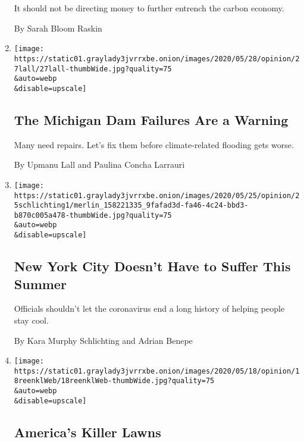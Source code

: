 \begin{enumerate}
  It should not be directing money to further entrench the carbon
  economy.

  By Sarah Bloom Raskin
\item
  \href{/2020/05/27/opinion/michigan-edenville-dam.html}{}

  \texttt{[image: https://static01.graylady3jvrrxbe.onion/images/2020/05/28/opinion/27lall/27lall-thumbWide.jpg?quality=75\\\&auto=webp\\\&disable=upscale]}

  \hypertarget{the-michigan-dam-failures-are-a-warning}{%
  \subsection{The Michigan Dam Failures Are a
  Warning}\label{the-michigan-dam-failures-are-a-warning}}

  Many need repairs. Let's fix them before climate-related flooding gets
  worse.

  By Upmanu Lall and Paulina Concha Larrauri
\item
  \href{/2020/05/25/opinion/new-york-summer-coronavirus.html}{}

  \texttt{[image: https://static01.graylady3jvrrxbe.onion/images/2020/05/25/opinion/25schlichting1/merlin\_158221335\_9fafad3d-fa46-4c24-bbd3-b870c005a478-thumbWide.jpg?quality=75\\\&auto=webp\\\&disable=upscale]}

  \hypertarget{new-york-city-doesnt-have-to-suffer-this-summer}{%
  \subsection{New York City Doesn't Have to Suffer This
  Summer}\label{new-york-city-doesnt-have-to-suffer-this-summer}}

  Officials shouldn't let the coronavirus end a long history of helping
  people stay cool.

  By Kara Murphy Schlichting and Adrian Benepe
\item
  \href{/2020/05/18/opinion/lawn-pesticides-insect-extinction.html}{}

  \texttt{[image: https://static01.graylady3jvrrxbe.onion/images/2020/05/18/opinion/18reenklWeb/18reenklWeb-thumbWide.jpg?quality=75\\\&auto=webp\\\&disable=upscale]}

  \hypertarget{americas-killer-lawns}{%
  \subsection{America's Killer Lawns}\label{americas-killer-lawns}}


\end{enumerate}

